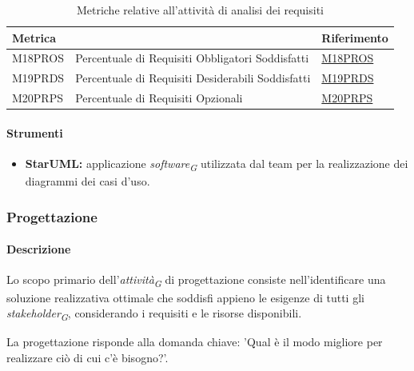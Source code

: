 \vspace{0.2cm}

\begin{table}[H]
    \centering
    \begin{tabular}{|C{3cm}|L{4cm}|C{3cm}|}
    \hline
    \textbf{Metrica} &  & \textbf{Riferimento} \\
    \hline \hline
    M18PROS & Percentuale di Requisiti Obbligatori Soddisfatti & \hyperlink{item:M18PROS}{M18PROS} \\
    M19PRDS & Percentuale di Requisiti Desiderabili Soddisfatti & \hyperlink{item:M19PRDS}{M19PRDS} \\
    M20PRPS & Percentuale di Requisiti Opzionali & \hyperlink{item:M20PRPS}{M20PRPS} \\
    \hline
    \end{tabular}
    \caption{Metriche relative all'attività di analisi dei requisiti}
\end{table}

\paragraph{Strumenti}
\begin{itemize}
    \item \textbf{StarUML:} applicazione \textit{software}\textsubscript{\textit{G}} utilizzata dal team per la realizzazione dei diagrammi dei casi d'uso.
\end{itemize}

\subsubsection{Progettazione}

\paragraph{Descrizione}
Lo scopo primario dell'\textit{attività}\textsubscript{\textit{G}} di progettazione consiste nell'identificare una soluzione realizzativa ottimale che soddisfi appieno le esigenze di tutti gli \textit{stakeholder}\textsubscript{\textit{G}}, considerando i requisiti e le risorse disponibili.

\vspace{0.2cm}

La progettazione risponde alla domanda chiave: 'Qual è il modo migliore per realizzare ciò di cui c'è bisogno?'.

\vspace{0.2cm}

